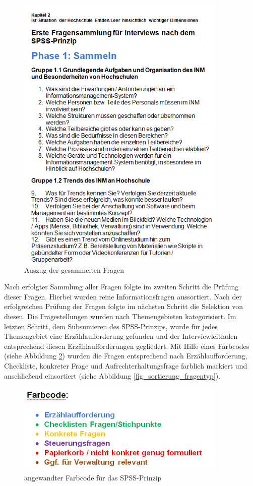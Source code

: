 \begin{figure}[h!]
	\centering
	\includegraphics[width=10cm]{kapitel/gruppe2/bilder/auszug_fragen}
	\caption{Auszug der gesammelten Fragen}
	\label{fig_auszug_fragen_sammeln}
\end{figure}
Nach erfolgter Sammlung aller Fragen folgte im zweiten Schritt die Prüfung dieser Fragen. Hierbei wurden reine Informationsfragen aussortiert. Nach der erfolgreichen Prüfung der Fragen folgte im nächsten Schritt die Selektion von diesen. Die Fragestellungen wurden nach Themengebieten kategorisiert. Im letzten Schritt, dem Subsumieren des SPSS-Prinzips, wurde für jedes Themengebiet eine Erzählaufforderung gefunden und der Interviewleitfaden entsprechend diesen Erzählaufforderungen gegliedert. Mit Hilfe eines Farbcodes (siehe Abbildung \ref{fig_farbcode_SPSS}) wurden die Fragen entsprechend nach Erzählaufforderung, Checkliste, konkreter Frage und Aufrechterhaltungsfrage farblich markiert und anschließend einsortiert (siehe Abbildung \ref{fig_sortierung_fragentyp}).

\begin{figure}[h!]
	\centering
	\includegraphics[width=10cm]{kapitel/gruppe2/bilder/farbcode_spss}
	\caption{angewandter Farbcode für das SPSS-Prinzip}
	\label{fig_farbcode_SPSS}
\end{figure}

